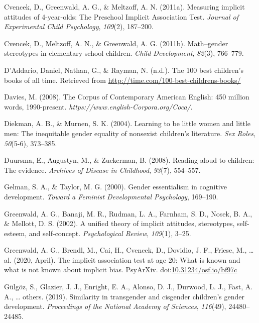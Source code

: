 \documentclass[
  english,
  ,man,floatsintext]{apa6}
\begin{document}
\leavevmode\hypertarget{ref-cvencek2011measuring}{}%
Cvencek, D., Greenwald, A. G., \& Meltzoff, A. N. (2011a). Measuring implicit attitudes of 4-year-olds: The Preschool Implicit Association Test. \emph{Journal of Experimental Child Psychology}, \emph{109}(2), 187--200.

\leavevmode\hypertarget{ref-cvencek2011math}{}%
Cvencek, D., Meltzoff, A. N., \& Greenwald, A. G. (2011b). Math--gender stereotypes in elementary school children. \emph{Child Development}, \emph{82}(3), 766--779.

\leavevmode\hypertarget{ref-time_100_kidbooks}{}%
D'Addario, Daniel, Nathan, G., \& Rayman, N. (n.d.). The 100 best children's books of all time. Retrieved from \url{http://time.com/100-best-childrens-books/}

\leavevmode\hypertarget{ref-davies2008corpus}{}%
Davies, M. (2008). The Corpus of Contemporary American English: 450 million words, 1990-present. \emph{https://www.english-Corpora.org/Coca/}.

\leavevmode\hypertarget{ref-diekman2004learning}{}%
Diekman, A. B., \& Murnen, S. K. (2004). Learning to be little women and little men: The inequitable gender equality of nonsexist children's literature. \emph{Sex Roles}, \emph{50}(5-6), 373--385.

\leavevmode\hypertarget{ref-duursma2008reading}{}%
Duursma, E., Augustyn, M., \& Zuckerman, B. (2008). Reading aloud to children: The evidence. \emph{Archives of Disease in Childhood}, \emph{93}(7), 554--557.

\leavevmode\hypertarget{ref-gelman2000gender}{}%
Gelman, S. A., \& Taylor, M. G. (2000). Gender essentialism in cognitive development. \emph{Toward a Feminist Developmental Psychology}, 169--190.

\leavevmode\hypertarget{ref-greenwald2002unified}{}%
Greenwald, A. G., Banaji, M. R., Rudman, L. A., Farnham, S. D., Nosek, B. A., \& Mellott, D. S. (2002). A unified theory of implicit attitudes, stereotypes, self-esteem, and self-concept. \emph{Psychological Review}, \emph{109}(1), 3--25.

\leavevmode\hypertarget{ref-greenwald2020}{}%
Greenwald, A. G., Brendl, M., Cai, H., Cvencek, D., Dovidio, J. F., Friese, M., \ldots{} al. (2020, April). The implicit association test at age 20: What is known and what is not known about implicit bias. PsyArXiv. doi:\href{https://doi.org/10.31234/osf.io/bf97c}{10.31234/osf.io/bf97c}

\leavevmode\hypertarget{ref-gulgoz2019similarity}{}%
Gülgöz, S., Glazier, J. J., Enright, E. A., Alonso, D. J., Durwood, L. J., Fast, A. A., \ldots{} others. (2019). Similarity in transgender and cisgender children's gender development. \emph{Proceedings of the National Academy of Sciences}, \emph{116}(49), 24480--24485.
\end{document}
